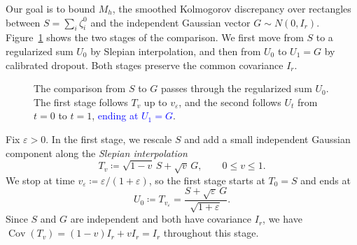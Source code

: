 \documentclass[11pt,letterpaper]{article}
\theoremstyle{remark}
\newcommand{\Cov}{\operatorname{Cov}}
\begin{document}
{Our goal is to bound \(M_h\), the {smoothed Kolmogorov discrepancy over rectangles} between
\(S=\sum_i\zeta_i^0\) and the independent Gaussian vector \(G\sim N(0,I_r)\).
Figure~\ref{fig:two-stage-path} shows the two stages of the comparison.
We first move from \(S\) to a regularized sum \(U_0\) by Slepian interpolation,
and then from \(U_0\) to \(U_1=G\) by calibrated dropout.
Both stages preserve the common covariance \(I_r\).}

\begin{figure}[!htbp]
\centering
{}
\caption{The comparison from \(S\) to \(G\) passes through the regularized
sum \(U_0\). The first stage follows \(T_v\) up to \(v_\varepsilon\),
and the second follows \(U_t\) from \(t=0\) to \(t=1\),
\textcolor{blue}{ending at \(U_1=G\)}.}
\label{fig:two-stage-path}
\end{figure}

{Fix \(\varepsilon>0\). In the first stage, we rescale \(S\)
and add a small independent Gaussian component along the
\emph{Slepian interpolation}}
\[
 T_v\coloneqq\sqrt{1-v}\,S+\sqrt v\,G,
 \qquad 0\le v\le1.
\]
{We stop at time \(v_\varepsilon\coloneqq\varepsilon/(1+\varepsilon)\),
so the first stage starts at \(T_0=S\) and ends at}
\[
 U_0\coloneqq T_{v_\varepsilon}
 =\frac{S+\sqrt\varepsilon\,G}{\sqrt{1+\varepsilon}}.
\]
{Since \(S\) and \(G\) are independent and both have covariance
\(I_r\), we have \(\Cov(T_v)=(1-v)I_r+vI_r=I_r\) throughout this stage.}
\end{document}
